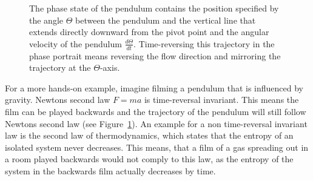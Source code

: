 \begin{figure}[ht]
    \centering
    \begin{minipage}{0.34\textwidth}
        \centering
        \def\svgwidth{\textwidth}
        
        \def\svgwidth{\textwidth}
        
    \end{minipage}
    \begin{minipage}{0.2\textwidth}
        \centering
        \def\svgwidth{\textwidth}
        {\Huge }
    \end{minipage}
    \begin{minipage}{0.34\textwidth}
        \centering
        \def\svgwidth{\textwidth}
        
        \def\svgwidth{\textwidth}
        
    \end{minipage}
    \caption{The phase state of the pendulum contains the position specified by the angle \(\Theta \) between the pendulum and the vertical line that extends directly downward from the pivot point and the angular velocity of the pendulum \(\frac{d\Theta}{dt}\). Time-reversing this trajectory in the phase portrait means reversing the flow direction and mirroring the trajectory at the \(\Theta \)-axis.}\label{fig:phase_plot}
\end{figure}

For a more hands-on example, imagine filming a pendulum that is influenced by gravity.
Newtons second law \(F=ma\) is time-reversal invariant. 
This means the film can be played backwards and the trajectory of the pendulum will still follow Newtons second law (see Figure~\ref{fig:phase_plot}).
An example for a non time-reversal invariant law is the second law of thermodynamics, which states that the entropy of an isolated system never decreases.
This means, that a film of a gas spreading out in a room played backwards would not comply to this law, as the entropy of the system in the backwards film actually decreases by time.


